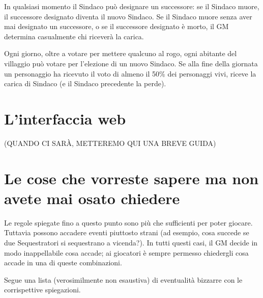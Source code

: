 \documentclass[a4paper,10pt]{article}
\begin{document}
In qualsiasi momento il Sindaco può designare un successore: se il Sindaco muore, il successore designato diventa il nuovo Sindaco. Se il Sindaco muore senza aver mai designato un successore, o se il successore designato è morto, il GM determina casualmente chi riceverà la carica.

Ogni giorno, oltre a votare per mettere qualcuno al rogo, ogni abitante del villaggio può votare per l'elezione di un nuovo Sindaco. Se alla fine della giornata un personaggio ha ricevuto il voto di almeno il 50\% dei personaggi vivi, riceve la carica di Sindaco (e il Sindaco precedente la perde).



\pagebreak
\section{L'interfaccia web}
(QUANDO CI SARÀ, METTEREMO QUI UNA BREVE GUIDA)



\section{Le cose che vorreste sapere ma non avete mai osato chiedere}
\label{faq}

Le regole spiegate fino a questo punto sono più che sufficienti per poter giocare. Tuttavia possono accadere eventi piuttosto strani (ad esempio, cosa succede se due Sequestratori si sequestrano a vicenda?). In tutti questi casi, il GM decide in modo inappellabile cosa accade; ai giocatori è sempre permesso chiedergli cosa accade in una di queste combinazioni.

Segue una lista (verosimilmente non esaustiva) di eventualità bizzarre con le corrispettive spiegazioni.
\end{document}
